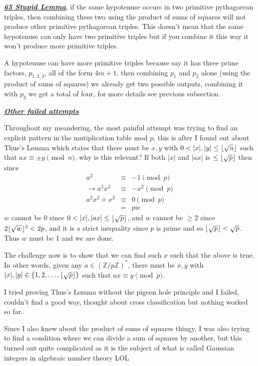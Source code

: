 \documentclass[aps,preprint,preprintnumbers,nofootinbib,showpacs,prd]{revtex4-1}
\newcommand{\nbea}{\begin{eqnarray*}}
\newcommand{\neea}{\end{eqnarray*}}
\DeclarePairedDelimiter{\floor}{\lfloor}{\rfloor}
\begin{document}
\underline{\textit{\textbf{65 Stupid Lemma}}}, if the same hypotenuse occurs in two primitive pythagorean triples, then combining these two using the product of sums of squares will not produce other primitive pythagorean triples. This doesn't mean that the same hypotenuse can only have two primitive triples but if you combine it this way it won't produce more primitive triples.

A hypotenuse can have more primitive triples because say it has three prime factors, $p_{1,2,3}$, all of the form $4m + 1$, then combining $p_1$ and $p_2$ alone (using the product of sums of squares) we already get two possible outputs, combining it with $p_3$ we get a total of four, for more details see previous subsection.

\smallskip
\underline{\textit{\textbf{Other failed attempts}}}
\smallskip

Throughout my meandering, the most painful attempt was trying to find an explicit pattern in the mutiplication table mod $p$, this is after I found out about Thue's Lemma which states that there must be $x,y$ with $0<|x|,|y|\le \floor{\sqrt{n}}$ such that $ax \equiv \pm y \pmod{n}$, why is this relevant? If both $|x|$ and $|ax|$ is $\le \floor{\sqrt{p}}$ then since
%
\nbea
a^2 & \equiv & -1 \pmod{p} \\
\to a^2x^2 & \equiv & -x^2 \pmod{p} \\
a^2x^2 + x^2 & \equiv & 0 \pmod{p} \\
& = & pw
\neea
%
$w$ cannot be 0 since $0 < |x|, |ax| \le \floor{\sqrt{p}}$, and $w$ cannot be $\ge 2$ since $2\floor{\sqrt{w}}^2 < 2p$, and it is a strict inequality since $p$ is prime and so $\floor{\sqrt{p}} < \sqrt{p}$. Thus $w$ must be 1 and we are done.

The challenge now is to show that we can find such $x$ such that the above is true. In other words, given any $a \in (\mathbb{Z}/p\mathbb{Z})^*$, there must be $x, y$ with $|x|,|y| \in \{1,2,\dots,\floor{\sqrt{p}}\}$ such that $ax \equiv y \pmod{p}$.

I tried proving Thue's Lemma without the pigeon hole principle and I failed, couldn't find a good way, thought about cross classification but nothing worked so far.

Since I also knew about the product of sums of squares thingy, I was also trying to find a condition where we can divide a sum of squares by another, but this turned out quite complicated as it is the subject of what is called Gaussian integers in algebraic number theory LOL
\end{document}
